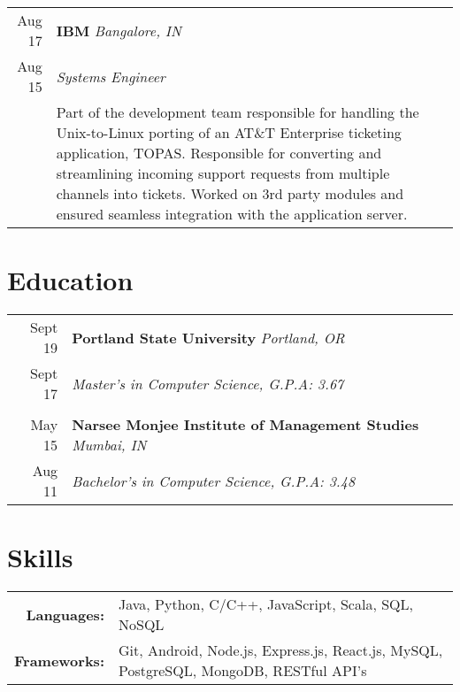 \documentclass[article,10pt]{article}
\begin{document}
\begin{tabular}{r|p{17cm}}
 {Aug \textquotesingle{}17}& \textbf{IBM} \sl{Bangalore, IN} \\
  {Aug \textquotesingle{}15}& \emph{Systems Engineer}\\
  & \footnotesize{Part of the development team responsible for handling the Unix-to-Linux porting of an AT\&T Enterprise ticketing application, TOPAS. Responsible for converting and streamlining incoming support requests from multiple channels into tickets. Worked on 3rd party modules and ensured seamless integration with the application server.}\\
\end{tabular}

\section{Education}
\begin{tabular}{r|p{17cm}}
 Sept \textquotesingle{}19 & \textbf{Portland State University} \emph{Portland, OR} \\ 
 Sept \textquotesingle{}17 & \emph{Master's in Computer Science, \textit{G.P.A: 3.67}}\\\multicolumn{2}{c}{} \\
 May \textquotesingle{}15 & \textbf{Narsee Monjee Institute of Management Studies} \emph{Mumbai, IN} \\
 Aug \textquotesingle{}11 & \emph{Bachelor's in Computer Science, \textit{G.P.A: 3.48}}\\%
\end{tabular}


\section{Skills}
\begin{tabular}{rl}
	\textbf{Languages:}&Java, Python, C/C++, JavaScript, Scala, SQL, NoSQL\\
	\textbf{Frameworks:}&Git, Android, Node.js, Express.js, React.js, MySQL, PostgreSQL, MongoDB, RESTful API’s \\
\end{tabular}


\end{document}
